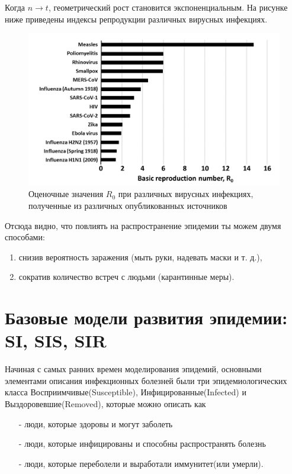 Когда $ n \rightarrow t $, геометрический рост становится экспоненциальным.
На рисунке ниже приведены индексы репродукции различных вирусных инфекциях.
\begin{figure}[h]

\centering

\includegraphics[width=0.8\linewidth]{Basic-reproduction-numbers.png}

\caption{Оценочные значения $R_0$ при различных вирусных инфекциях, полученные из различных опубликованных источников}

\label{fig:mpr}

\end{figure}
Отсюда видно, что повлиять на распространение эпидемии ты можем двумя способами:
\begin{enumerate}
\item снизив вероятность заражения (мыть руки, надевать маски и т. д.),
\item сократив количество встреч с людьми (карантинные меры).
\end{enumerate}

\section{Базовые модели развития эпидемии: SI, SIS, SIR}\label{2sec:basic-models}
Начиная с самых ранних времен моделирования эпидемий, основными элементами описания инфекционных болезней были три эпидемиологических класса Восприимчивые(Susceptible), Инфицированные(Infected) и Выздоровевшие(Removed), которые можно описать как
\begin{itemize}
\item[-] люди, которые здоровы и могут заболеть
\item[-] люди, которые инфицированы и способны распространять болезнь
\item[-] люди, которые переболели и выработали иммунитет(или умерли).
\end{itemize}

